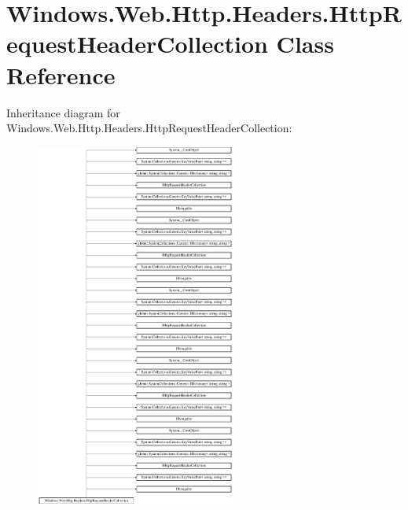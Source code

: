 \hypertarget{class_windows_1_1_web_1_1_http_1_1_headers_1_1_http_request_header_collection}{}\section{Windows.\+Web.\+Http.\+Headers.\+Http\+Request\+Header\+Collection Class Reference}
\label{class_windows_1_1_web_1_1_http_1_1_headers_1_1_http_request_header_collection}
Inheritance diagram for Windows.\+Web.\+Http.\+Headers.\+Http\+Request\+Header\+Collection\+:\begin{figure}[H]
\begin{center}
\leavevmode
\includegraphics[height=12.000000cm]{class_windows_1_1_web_1_1_http_1_1_headers_1_1_http_request_header_collection}
\end{center}
\end{figure}
